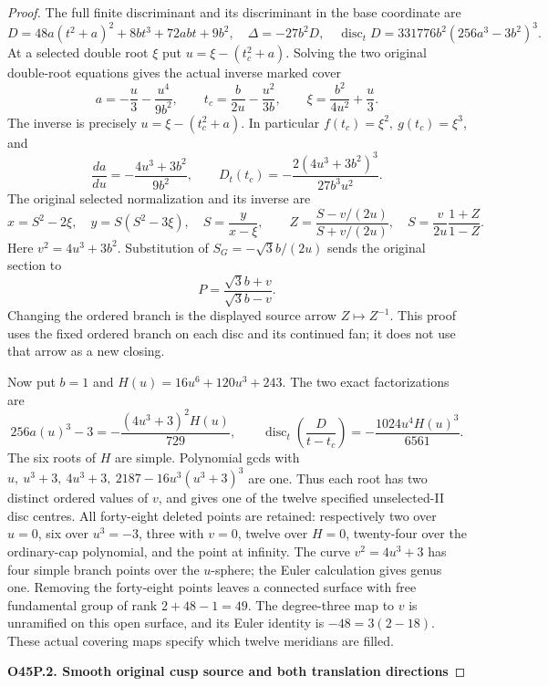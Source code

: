 \begin{proof}
The full finite discriminant and its discriminant in the base coordinate
are
\[
 D=48a(t^2+a)^2+8bt^3+72abt+9b^2,\quad
 \Delta=-27b^2D,\quad
 \operatorname{disc}_tD=331776b^2(256a^3-3b^2)^3.
 \tag{O45P.3}
\]
At a selected double root \(\xi\) put \(u=\xi-(t_c^2+a)\).
Solving the two original double-root equations gives the actual inverse
marked cover
\[
 a=-\frac u3-\frac{u^4}{9b^2},\qquad
 t_c=\frac b{2u}-\frac{u^2}{3b},\qquad
 \xi=\frac{b^2}{4u^2}+\frac u3.
 \tag{O45P.4}
\]
The inverse is precisely \(u=\xi-(t_c^2+a)\). In particular
\(f(t_c)=\xi^2,\ g(t_c)=\xi^3\), and
\[
 \frac{da}{du}=-\frac{4u^3+3b^2}{9b^2},\qquad
 D_t(t_c)=-\frac{2(4u^3+3b^2)^3}{27b^3u^2}.
 \tag{O45P.5}
\]
The original selected normalization and its inverse are
\[
 x=S^2-2\xi,\quad y=S(S^2-3\xi),\quad S=\frac y{x-\xi},
 \qquad
 Z=\frac{S-v/(2u)}{S+v/(2u)},\quad
 S=\frac v{2u}\frac{1+Z}{1-Z}.
 \tag{O45P.6}
\]
Here \(v^2=4u^3+3b^2\). Substitution of
\(S_G=-\sqrt3b/(2u)\) sends the original section to
\[
 P=\frac{\sqrt3b+v}{\sqrt3b-v}.
 \tag{O45P.7}
\]
Changing the ordered branch is the displayed source arrow
\(Z\mapsto Z^{-1}\). This proof uses the fixed ordered branch on each
disc and its continued fan; it does not use that arrow as a new closing.

Now put \(b=1\) and \(H(u)=16u^6+120u^3+243\). The two exact
factorizations are
\[
 256a(u)^3-3=-\frac{(4u^3+3)^2H(u)}{729},\qquad
 \operatorname{disc}_t\!\left(\frac{D}{t-t_c}\right)
        =-\frac{1024u^4H(u)^3}{6561}.
 \tag{O45P.8}
\]
The six roots of \(H\) are simple. Polynomial gcds with
\(u,\ u^3+3,\ 4u^3+3,\ 2187-16u^3(u^3+3)^3\) are one.
Thus each root has two distinct ordered values of \(v\), and gives one
of the twelve specified unselected-II disc centres.
All forty-eight deleted points are retained: respectively two over
\(u=0\), six over \(u^3=-3\), three with \(v=0\), twelve over \(H=0\),
twenty-four over the ordinary-cap polynomial, and the point at infinity.
The curve \(v^2=4u^3+3\) has four simple branch points over the
\(u\)-sphere; the Euler calculation gives genus one. Removing the
forty-eight points leaves a connected surface with free fundamental
group of rank \(2+48-1=49\). The degree-three map to \(v\) is unramified
on this open surface, and its Euler identity is
\(-48=3(2-18)\). These actual covering maps specify which twelve
meridians are filled.

\par

\medskip\noindent\textbf{O45P.2. Smooth original cusp source and both translation directions}


\end{proof}
